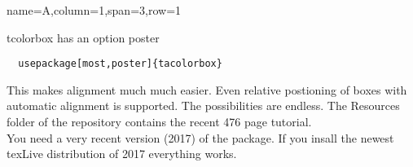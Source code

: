 
\newlength{\mycolwidth}
\setlength{\mycolwidth}{.41\textwidth} %

\newlength{\vblocksep}
\setlength{\vblocksep}{3ex} %

    \begin{tcbposter}[
        poster = {showframe,height=.9\textheight,spacing=2cm},
        boxes = {beamer,colframe=blue!50!black,colback=blue!50,colupper=yellow!50},
      ]
      \begin{posterboxenv}[adjusted title ={And use the tcolorbox package instead}]{name=A,column=1,span=3,row=1}{\LARGE tcolorbox has an option poster

        
\begin{verbatim}
  usepackage[most,poster]{tacolorbox} 
\end{verbatim}
        
        This makes alignment much much easier.
        Even relative postioning of boxes with automatic alignment is supported.
        The possibilities are endless.
        The Resources folder of the repository contains the recent 476 page tutorial.
        \\
        You need a very recent version (2017)  of the package.
        If you insall the newest texLive distribution of 2017 everything works.

      }
      \end{posterboxenv}
    \end{tcbposter}
